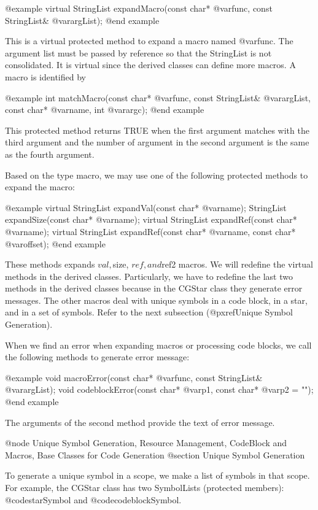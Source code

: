 @example
virtual StringList expandMacro(const char* @var{func}, const StringList& @var{argList});
@end example

This is a virtual protected method to expand a macro named @var{func}. The
argument list must be passed by reference so that the StringList is not
consolidated. It is virtual since the derived classes can define more macros.
A macro is identified by

@example
int matchMacro(const char* @var{func}, const StringList& @var{argList}, const char* @var{name}, int @var{argc});
@end example

This protected method returns TRUE when the first argument matches with the
third argument and the number of argument in the second argument is the same
as the fourth argument.

Based on the type macro, we may use one of the following protected methods to 
expand the macro:

@example
virtual StringList expandVal(const char* @var{name});
StringList expandSize(const char* @var{name});
virtual StringList expandRef(const char* @var{name});
virtual StringList expandRef(const char* @var{name}, const char* @var{offset});
@end example

These methods expands $val, $size, $ref, and $ref2 macros. We will redefine
the virtual methods in the derived classes. Particularly, we have to redefine
the last two methods in the derived classes because in the CGStar class they
generate error messages. The other macros deal with unique symbols in a
code block, in a star, and in a set of symbols. Refer to the next subsection
(@pxref{Unique Symbol Generation}).

When we find an error when expanding macros or processing code blocks, we
call the following methods to generate error message:

@example
void macroError(const char* @var{func}, const StringList& @var{argList});
void codeblockError(const char* @var{p1},  const char* @var{p2} = "");
@end example

The arguments of the second method provide the text of error message.

@node Unique Symbol Generation, Resource Management, CodeBlock and Macros, Base Classes for Code Generation
@section Unique Symbol Generation

To generate a unique symbol in a scope, we make a list of symbols in that
scope. For example, the CGStar class has two SymbolLists (protected
members): @code{starSymbol} and @code{codeblockSymbol}. 

